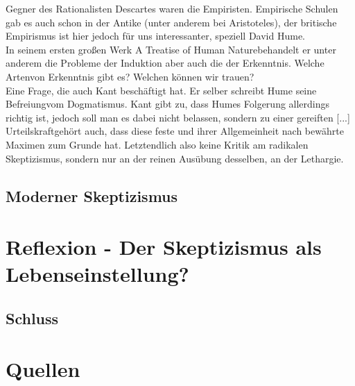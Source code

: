 \documentclass[12pt,a4paper]{article}
\begin{document}
Gegner des Rationalisten Descartes waren die Empiristen. Empirische Schulen gab es auch schon in der Antike (unter anderem bei Aristoteles), der britische Empirismus ist hier jedoch für uns interessanter, speziell David Hume.\\
 In seinem ersten großen Werk \glqq A Treatise of Human Nature\glqq behandelt er unter anderem die Probleme der Induktion aber auch die der Erkenntnis. Welche \glqq Arten\grqq von Erkenntnis gibt es? Welchen können wir \grqq trauen\grqq?\\

Eine Frage, die auch Kant beschäftigt hat. Er selber schreibt Hume seine \glqq Befreiung\grqq vom Dogmatismus. Kant gibt zu, dass Humes Folgerung allerdings richtig ist, jedoch soll man es dabei nicht belassen, sondern zu einer  \glqq gereiften [...] Urteilskraft\grqq gehört auch, dass diese \glqq feste und ihrer Allgemeinheit nach bewährte Maximen zum Grunde hat\grqq.%
Letztendlich also keine Kritik am radikalen Skeptizismus, sondern nur an der reinen Ausübung desselben, an der Lethargie.\\
	\subsection{Moderner Skeptizismus}
\section{Reflexion - Der Skeptizismus als Lebenseinstellung?}
	\subsection{Schluss}


\section*{Quellen}
\end{document}

